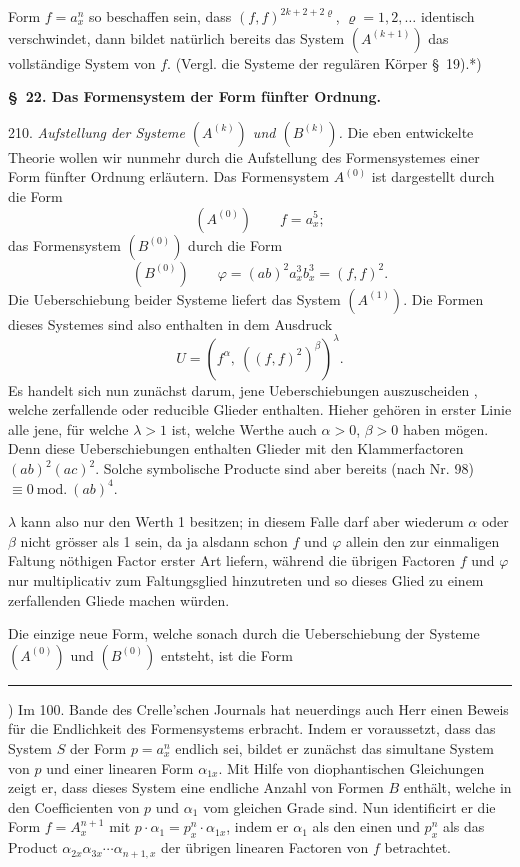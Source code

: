 \documentclass[11pt]{article}
\providecommand{\gesperrt}[1]{\textls[130]{#1}}
\providecommand{\weberpage}[1]{}
\begin{document}
\weberpage{236}
Form $f = a_x^n$ so beschaffen sein, dass $(f,f)^{2k+2+2\varrho}$, $\varrho = 1, 2, \ldots$
identisch verschwindet, dann bildet natürlich bereits das System
$(A^{(k+1)})$ das vollständige System von $f$. (Vergl. die Systeme der
regulären Körper \S\ 19).*)

\begin{center}
\textbf{\S\ 22. Das Formensystem der Form fünfter Ordnung.}
\end{center}

210. \textit{Aufstellung der Systeme $(A^{(k)})$ und $(B^{(k)})$.} Die eben entwickelte
 Theorie wollen wir nunmehr durch die Aufstellung des Formensystemes
 einer Form fünfter Ordnung erläutern. Das Formensystem
$A^{(0)}$ ist dargestellt durch die Form
\[
(A^{(0)}) \qquad f = a_x^5;
\]
das Formensystem $(B^{(0)})$ durch die Form
\[
(B^{(0)}) \qquad \varphi = (ab)^2 a_x^3 b_x^3 = (f,f)^2.
\]
Die Ueberschiebung beider Systeme liefert das System $(A^{(1)})$. Die
Formen dieses Systemes sind also enthalten in dem Ausdruck
\[
U = \left(f^\alpha,\ ((f,f)^2)^\beta\right)^\lambda.
\]
Es handelt sich nun zunächst darum, jene Ueberschiebungen auszuscheiden
, welche zerfallende oder reducible Glieder enthalten. Hieher
gehören in erster Linie alle jene, für welche $\lambda > 1$ ist, welche Werthe
auch $\alpha > 0$, $\beta > 0$ haben mögen. Denn diese Ueberschiebungen enthalten
 Glieder mit den Klammerfactoren $(ab)^2 (ac)^2$. Solche symbolische
Producte sind aber bereits (nach Nr. 98) $\equiv 0\ \mathrm{mod.}\ (ab)^4$.

$\lambda$ kann also nur den Werth 1 besitzen; in diesem Falle darf aber
wiederum $\alpha$ oder $\beta$ nicht grösser als 1 sein, da ja alsdann schon $f$
und $\varphi$ allein den zur einmaligen Faltung nöthigen Factor erster
Art liefern, während die übrigen Factoren $f$ und $\varphi$ nur multiplicativ
zum Faltungsglied hinzutreten und so dieses Glied zu einem zerfallenden
 Gliede machen würden.

Die einzige neue Form, welche sonach durch die Ueberschiebung
der Systeme $(A^{(0)})$ und $(B^{(0)})$ entsteht, ist die Form

\bigskip
\noindent\rule{4cm}{0.4pt}

\noindent *) Im 100. Bande des Crelle'schen Journals hat neuerdings auch Herr
\gesperrt{Mertens} einen Beweis für die Endlichkeit des Formensystems erbracht.
Indem er voraussetzt, dass das System $S$ der Form $p = a_x^n$ endlich
sei, bildet er zunächst das simultane System von $p$ und einer linearen
Form $\alpha_{1x}$. Mit Hilfe von diophantischen Gleichungen zeigt er, dass
dieses System eine endliche Anzahl von Formen $B$ enthält, welche
in den Coefficienten von $p$ und $\alpha_1$ vom gleichen Grade sind.
Nun identificirt er die Form $f = A_x^{n+1}$ mit $p \cdot \alpha_1 = p_x^n \cdot \alpha_{1x}$, indem
er $\alpha_1$ als den einen und $p_x^n$ als das Product $\alpha_{2x}\alpha_{3x}\cdots\alpha_{n+1,x}$ der
übrigen linearen Factoren von $f$ betrachtet.
\end{document}
